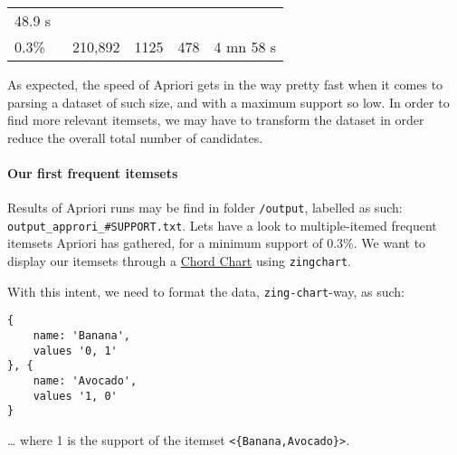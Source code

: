 \documentclass[11pt]{article}
\begin{document}
\begin{longtable}[]{@{}lllll@{}}
\begin{minipage}[t]{0.13\columnwidth}
48.9 s\strut
\end{minipage}\tabularnewline
\begin{minipage}[t]{0.14\columnwidth}\raggedright
0.3\%\strut
\end{minipage} & \begin{minipage}[t]{0.18\columnwidth}\raggedright
~210,892\strut
\end{minipage} & \begin{minipage}[t]{0.20\columnwidth}\raggedright
1125\strut
\end{minipage} & \begin{minipage}[t]{0.20\columnwidth}\raggedright
478\strut
\end{minipage} & \begin{minipage}[t]{0.13\columnwidth}\raggedright
4 mn 58 s\strut
\end{minipage}\tabularnewline
\bottomrule
\end{longtable}

As expected, the speed of Apriori gets in the way pretty fast when it
comes to parsing a dataset of such size, and with a maximum support so
low. In order to find more relevant itemsets, we may have to transform
the dataset in order reduce the overall total number of candidates.

\hypertarget{our-first-frequent-itemsets}{%
\paragraph{Our first frequent
itemsets}\label{our-first-frequent-itemsets}}

Results of Apriori runs may be find in folder \texttt{/output}, labelled
as such: \texttt{output\_approri\_\#SUPPORT.txt}. Lets have a look to
multiple-itemed frequent itemsets Apriori has gathered, for a minimum
support of 0.3\%. We want to display our itemsets through a
\href{https://www.zingchart.com/docs/chart-types/chord-diagrams/}{Chord
Chart} using \texttt{zingchart}.

With this intent, we need to format the data, \texttt{zing-chart}-way,
as such:

\begin{verbatim}
{
    name: 'Banana',
    values '0, 1'
}, {
    name: 'Avocado',
    values '1, 0'
}   
\end{verbatim}

\ldots{} where 1 is the support of the itemset
\texttt{\textless{}\{\textquotesingle{}Banana\textquotesingle{},\textquotesingle{}Avocado\textquotesingle{}\}\textgreater{}}.
\end{document}
